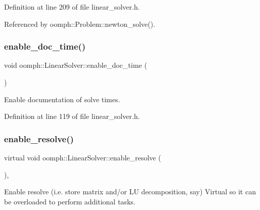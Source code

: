Definition at line 209 of file linear\+\_\+solver.\+h.



Referenced by oomph\+::\+Problem\+::newton\+\_\+solve().

\mbox{\label{classoomph_1_1LinearSolver_abeb9ef9127e927bf6df75d03645d6a81}} 
\subsubsection{\texorpdfstring{enable\+\_\+doc\+\_\+time()}{enable\_doc\_time()}}
{\footnotesize\ttfamily void oomph\+::\+Linear\+Solver\+::enable\+\_\+doc\+\_\+time (\begin{DoxyParamCaption}{ }\end{DoxyParamCaption})\hspace{0.3cm}{\ttfamily [inline]}}



Enable documentation of solve times. 



Definition at line 119 of file linear\+\_\+solver.\+h.

\mbox{\label{classoomph_1_1LinearSolver_a3000ebd9becb3468d8a6a821a9cc0cd9}} 
\subsubsection{\texorpdfstring{enable\+\_\+resolve()}{enable\_resolve()}}
{\footnotesize\ttfamily virtual void oomph\+::\+Linear\+Solver\+::enable\+\_\+resolve (\begin{DoxyParamCaption}{ }\end{DoxyParamCaption})\hspace{0.3cm}{\ttfamily [inline]}, {\ttfamily [virtual]}}



Enable resolve (i.\+e. store matrix and/or LU decomposition, say) Virtual so it can be overloaded to perform additional tasks. 



